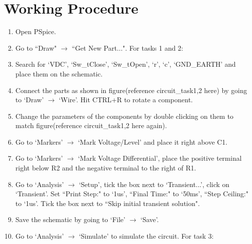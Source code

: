 \documentclass[12pt,a4paper]{article}
\begin{document}
	\section{Working Procedure}
	\begin{enumerate}
		\item Open PSpice.
		\item Go to ``Draw" $\rightarrow$ ``Get New Part...".
		\newline
		For tasks 1 and 2:
		
		\item Search for `VDC', `Sw\_tClose', `Sw\_tOpen', `r', `c', `GND\_EARTH' and place them on the schematic.
		\item Connect the parts as shown in figure(reference circuit\_task1,2 here) by going to `Draw' $\rightarrow$ `Wire'. Hit CTRL+R to rotate a component.
		\item Change the parameters of the components by double clicking on them to match figure(reference circuit\_task1,2 here again).
		\item Go to `Markers' $\rightarrow$ `Mark Voltage/Level' and place it right above C1.
		\item Go to `Markers' $\rightarrow$ `Mark Voltage Differential', place the positive terminal right below R2 and the negative terminal to the right of R1.
		\item Go to `Analysis' $\rightarrow$ `Setup', tick the box next to `Transient...', click on `Transient'. Set ``Print Step:" to `1us', ``Final Time:" to `50ms', ``Step Ceiling:" to `1us'. Tick the box next to ``Skip initial transient solution".
		\item Save the schematic by going to `File' $\rightarrow$ `Save'.
		\item Go to `Analysis' $\rightarrow$ `Simulate' to simulate the circuit.
		\newline
		For task 3:
		

\end{enumerate}
\end{document}
